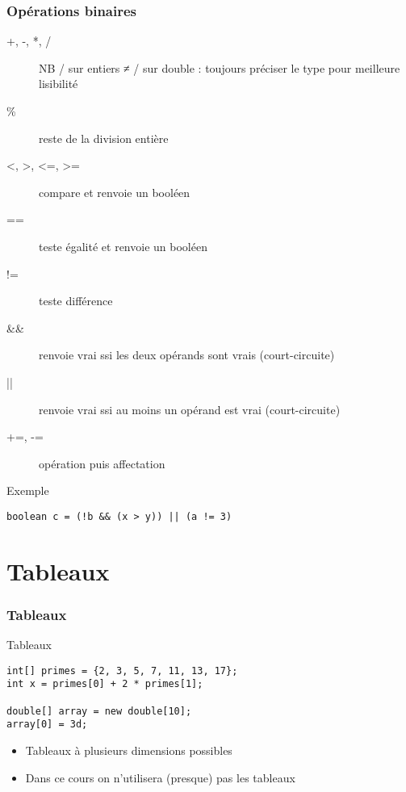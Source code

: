 \documentclass[english, french]{beamer}
\begin{document}
\begin{frame}[fragile]
	\frametitle{Opérations binaires}
	\begin{description}
		\item[+, -, *, /] NB / sur entiers ≠ / sur double : toujours préciser le type pour meilleure lisibilité
		\item[\%] reste de la division entière
		\item[<, >, <=, >=] compare et renvoie un booléen
		\item[==] teste égalité et renvoie un booléen
		\item[!=] teste différence
		\item[\&\&] renvoie vrai ssi les deux opérands sont vrais {\tiny (court-circuite)}
		\item[||] renvoie vrai ssi au moins un opérand est vrai {\tiny (court-circuite)}
		\item[+=, -=] opération puis affectation
	\end{description}
	\begin{block}{Exemple}
		\begin{lstlisting}
boolean c = (!b && (x > y)) || (a != 3)
		\end{lstlisting}	
	\end{block}
\end{frame}

\section{Tableaux}
\begin{frame}[fragile]
	\frametitle{Tableaux}
	\begin{block}{Tableaux}
		\begin{lstlisting}
int[] primes = {2, 3, 5, 7, 11, 13, 17};
int x = primes[0] + 2 * primes[1];

double[] array = new double[10];
array[0] = 3d;
		\end{lstlisting}	
	\end{block}
	\begin{itemize}
		\item Tableaux à plusieurs dimensions possibles
		\item Dans ce cours on n’utilisera (presque) pas les tableaux
	\end{itemize}
\end{frame}
\end{document}
